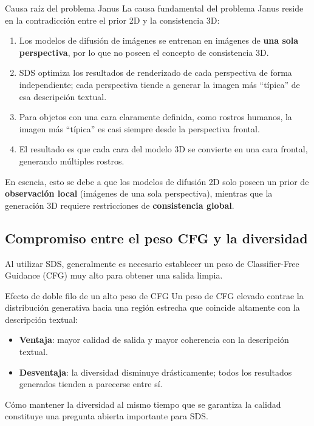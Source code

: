 \documentclass[a4paper]{article}
\begin{document}
\begin{warningbox}{Causa raíz del problema Janus}
La causa fundamental del problema Janus reside en la contradicción entre el prior 2D y la consistencia 3D:

\begin{enumerate}
    \item Los modelos de difusión de imágenes se entrenan en imágenes de \textbf{una sola perspectiva}, por lo que no poseen el concepto de consistencia 3D.
    \item SDS optimiza los resultados de renderizado de cada perspectiva de forma independiente; cada perspectiva tiende a generar la imagen más ``típica'' de esa descripción textual.
    \item Para objetos con una cara claramente definida, como rostros humanos, la imagen más ``típica'' es casi siempre desde la perspectiva frontal.
    \item El resultado es que cada cara del modelo 3D se convierte en una cara frontal, generando múltiples rostros.
\end{enumerate}

En esencia, esto se debe a que los modelos de difusión 2D solo poseen un prior de \textbf{observación local} (imágenes de una sola perspectiva), mientras que la generación 3D requiere restricciones de \textbf{consistencia global}.
\end{warningbox}

\subsection{Compromiso entre el peso CFG y la diversidad}

Al utilizar SDS, generalmente es necesario establecer un peso de Classifier-Free Guidance (CFG) muy alto para obtener una salida limpia.

\begin{knowledgebox}{Efecto de doble filo de un alto peso de CFG}
Un peso de CFG elevado contrae la distribución generativa hacia una región estrecha que coincide altamente con la descripción textual:

\begin{itemize}
    \item \textbf{Ventaja}: mayor calidad de salida y mayor coherencia con la descripción textual.
    \item \textbf{Desventaja}: la diversidad disminuye drásticamente; todos los resultados generados tienden a parecerse entre sí.
\end{itemize}

Cómo mantener la diversidad al mismo tiempo que se garantiza la calidad constituye una pregunta abierta importante para SDS.
\end{knowledgebox}
\end{document}
